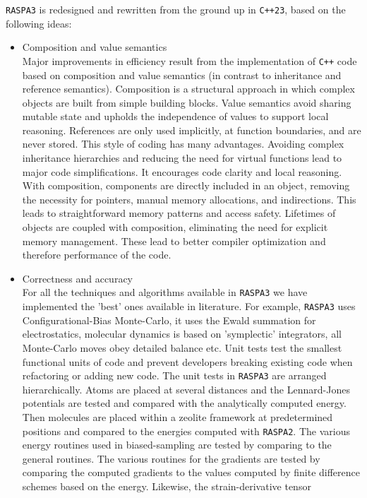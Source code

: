 \texttt{RASPA3} is redesigned and rewritten from the ground up in \texttt{C++23}, based on the following ideas:
\begin{itemize}
  \item{Composition and value semantics}\\
    Major improvements in efficiency result from the implementation of \texttt{C++} code based on composition 
  and value semantics (in contrast to inheritance and reference semantics). Composition is a structural 
  approach in which complex objects are built from simple building blocks. Value semantics avoid 
  sharing mutable state and upholds the independence of values to support local reasoning. 
  References are only used implicitly,  at function boundaries, and are never stored. 
  This style of coding has many advantages. Avoiding complex inheritance hierarchies and reducing the 
  need for virtual functions lead to major code simplifications. It encourages code clarity and 
  local reasoning. With composition, components are directly included in an object, removing the 
  necessity for pointers, manual memory allocations, and indirections. This leads to straightforward 
  memory patterns and access safety. Lifetimes of objects are coupled with composition, eliminating the 
  need for explicit memory management. These lead to better compiler optimization and therefore performance of the code.
  \item{Correctness and accuracy}\\
    For all the techniques and algorithms available in \texttt{RASPA3} we have implemented the 'best' ones available in literature. 
    For example, \texttt{RASPA3} uses Configurational-Bias Monte-Carlo, it uses the Ewald summation for electrostatics,
  molecular dynamics is based on 'symplectic' integrators, all Monte-Carlo moves obey detailed balance etc.
  Unit tests test the smallest functional units of code and prevent developers breaking existing code when 
  refactoring or adding new code.
    The unit tests in \texttt{RASPA3} are arranged hierarchically. Atoms are placed at several distances and the 
  Lennard-Jones potentials are tested and compared with the analytically computed energy. 
  Then molecules are placed within a zeolite framework at predetermined positions and compared to the 
    energies computed with \texttt{RASPA2}.
  The various energy routines used in biased-sampling are tested by comparing to the general routines.
  The various routines for the gradients are tested by comparing the computed gradients to the values 
  computed by finite difference schemes based on the energy. Likewise, the strain-derivative tensor 

\end{itemize}
